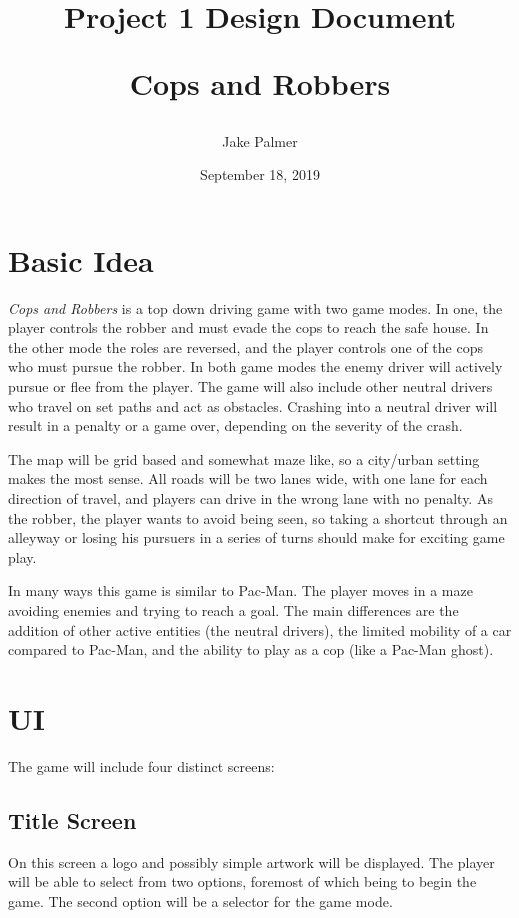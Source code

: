 \documentclass[12pt]{article}
\title{Project 1 Design Document}
\author{Jake Palmer}
\date{September 18, 2019}
\begin{document}
\maketitle
\title{\begin{center} \large{Cops and Robbers} \end{center}}

\section{Basic Idea} \label{intro}
\textit{Cops and Robbers} is a top down driving game with two game modes. In one, the player controls the robber and must evade the cops to reach the safe house. In the other mode the roles are reversed, and the player controls one of the cops who must pursue the robber. In both game modes the enemy driver will actively pursue or flee from the player. The game will also include other neutral drivers who travel on set paths and act as obstacles. Crashing into a neutral driver will result in a penalty or a game over, depending on the severity of the crash.

\par The map will be grid based and somewhat maze like, so a city/urban setting makes the most sense. All roads will be two lanes wide, with one lane for each direction of travel, and players can drive in the wrong lane with no penalty. As the robber, the player wants to avoid being seen, so taking a shortcut through an alleyway or losing his pursuers in a series of turns should make for exciting game play.

\par In many ways this game is similar to Pac-Man. The player moves in a maze avoiding enemies and trying to reach a goal. The main differences are the addition of other active entities (the neutral drivers), the limited mobility of a car compared to Pac-Man, and the ability to play as a cop (like a Pac-Man ghost).

\section{UI}
The game will include four distinct screens:

\subsection{Title Screen}
On this screen a logo and possibly simple artwork will be displayed. The player will be able to select from two options, foremost of which being to begin the game. The second option will be a selector for the game mode.
\end{document}
